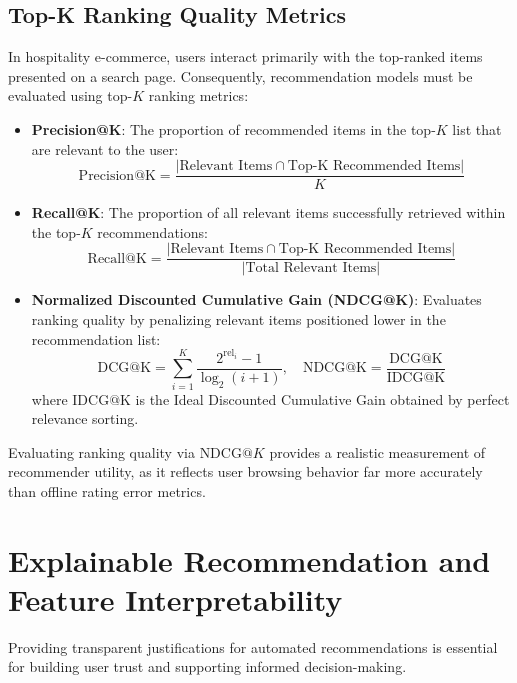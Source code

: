 \subsection{Top-K Ranking Quality Metrics}
In hospitality e-commerce, users interact primarily with the top-ranked items presented on a search page. Consequently, recommendation models must be evaluated using top-$K$ ranking metrics:
\begin{itemize}
    \item \textbf{Precision@K}: The proportion of recommended items in the top-$K$ list that are relevant to the user:
    \begin{equation}
    \text{Precision@K} = \frac{|\text{Relevant Items} \cap \text{Top-K Recommended Items}|}{K}
    \end{equation}
    \item \textbf{Recall@K}: The proportion of all relevant items successfully retrieved within the top-$K$ recommendations:
    \begin{equation}
    \text{Recall@K} = \frac{|\text{Relevant Items} \cap \text{Top-K Recommended Items}|}{|\text{Total Relevant Items}|}
    \end{equation}
    \item \textbf{Normalized Discounted Cumulative Gain (NDCG@K)}: Evaluates ranking quality by penalizing relevant items positioned lower in the recommendation list:
    \begin{equation}
    \text{DCG@K} = \sum_{i=1}^{K} \frac{2^{\text{rel}_i} - 1}{\log_2(i + 1)}, \quad \text{NDCG@K} = \frac{\text{DCG@K}}{\text{IDCG@K}}
    \end{equation}
    where $\text{IDCG@K}$ is the Ideal Discounted Cumulative Gain obtained by perfect relevance sorting.
\end{itemize}

Evaluating ranking quality via $\text{NDCG}@K$ provides a realistic measurement of recommender utility, as it reflects user browsing behavior far more accurately than offline rating error metrics.

\section{Explainable Recommendation and Feature Interpretability}
Providing transparent justifications for automated recommendations is essential for building user trust and supporting informed decision-making.

